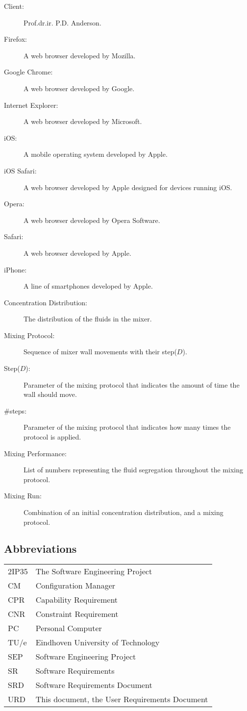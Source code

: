 \begin{description}
\item[Client:] Prof.dr.ir. P.D. Anderson.
\item[Firefox:] A web browser developed by Mozilla.
\item[Google Chrome:] A web browser developed by Google.
\item[Internet Explorer:] A web browser developed by Microsoft.
\item[iOS:] A mobile operating system developed by Apple.
\item[iOS Safari:] A web browser developed by Apple designed for devices running iOS.
\item[Opera:] A web browser developed by Opera Software.
\item[Safari:] A web browser developed by Apple.
\item[iPhone:] A line of smartphones developed by Apple.
\item[Concentration Distribution:] The distribution of the fluids in the mixer.
\item[Mixing Protocol:] Sequence of mixer wall movements with their step($D$).
\item[Step($D$):] Parameter of the mixing protocol that indicates the amount of time the wall should move.
\item[\#steps:] Parameter of the mixing protocol that indicates how many times the protocol is applied.
\item[Mixing Performance:] List of numbers representing the fluid segregation throughout the mixing protocol.
\item[Mixing Run:] Combination of an initial concentration distribution, and a mixing protocol.
\end{description}

\subsection{Abbreviations}
\begin{tabular}{l|l}
2IP35 & The Software Engineering Project \\
CM    &Configuration Manager \\
CPR & Capability Requirement \\
CNR & Constraint Requirement \\
PC & Personal Computer \\
TU/e  &Eindhoven University of Technology \\
SEP   &Software Engineering Project \\
SR    &Software Requirements \\
SRD   &Software Requirements Document \\
URD & This document, the User Requirements Document \\
\end{tabular}

